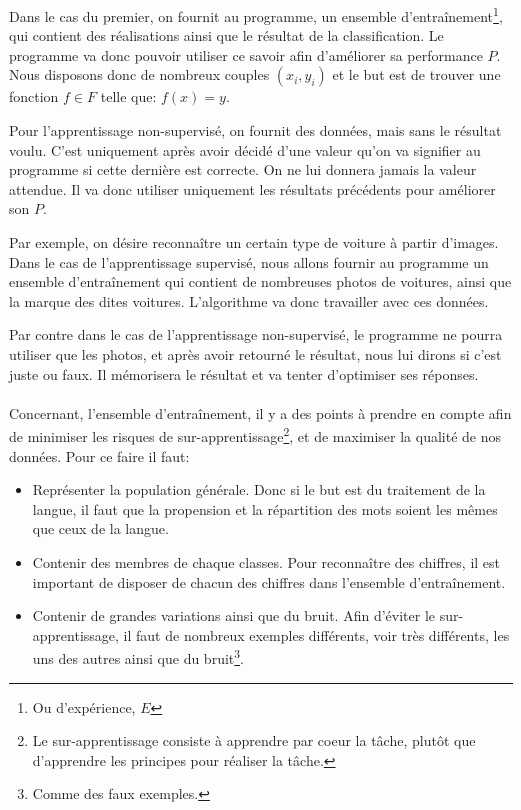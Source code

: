 \documentclass[a4paper, 11pt]{article}
\begin{document}
Dans le cas du premier, on fournit au programme, un ensemble d'entraînement\footnote{Ou d'expérience, $E$}, qui contient des réalisations ainsi que le résultat de la classification. Le programme va donc pouvoir utiliser ce savoir afin d'améliorer sa performance $P$.
Nous disposons donc de nombreux couples $(x_i, y_i)$ et le but est de trouver une fonction $f \in F$ telle que: $f(x) = y$.

Pour l'apprentissage non-supervisé, on fournit des données, mais sans le résultat voulu. C'est uniquement après avoir décidé d'une valeur qu'on va signifier au programme si cette dernière est correcte. On ne lui donnera jamais la valeur attendue. Il va donc utiliser uniquement les résultats précédents pour améliorer son $P$.

Par exemple, on désire reconnaître un certain type de voiture à partir d'images. Dans le cas de l'apprentissage supervisé, nous allons fournir au programme un ensemble d'entraînement qui contient de nombreuses photos de voitures, ainsi que la marque des dites voitures. L'algorithme va donc travailler avec ces données.

Par contre dans le cas de l'apprentissage non-supervisé, le programme ne pourra utiliser que les photos, et après avoir retourné le résultat, nous lui dirons si c'est juste ou faux. Il mémorisera le résultat et va tenter d'optimiser ses réponses.

\paragraph{}
Concernant, l'ensemble d'entraînement, il y a des points à prendre en compte afin de minimiser les risques de sur-apprentissage\footnote{Le sur-apprentissage consiste à apprendre par coeur la tâche, plutôt que d'apprendre les principes pour réaliser la tâche.}, et de maximiser la qualité de nos données.
Pour ce faire il faut:
\begin{itemize}
\item Représenter la population générale. Donc si le but est du traitement de la langue, il faut que la propension et la répartition des mots soient les mêmes que ceux de la langue.
\item Contenir des membres de chaque classes. Pour reconnaître des chiffres, il est important de disposer de chacun des chiffres dans l'ensemble d'entraînement.
\item Contenir de grandes variations ainsi que du bruit. Afin d'éviter le sur-apprentissage, il faut de nombreux exemples différents, voir très différents, les uns des autres ainsi que du bruit\footnote{Comme des faux exemples.}.
\end{itemize}
\end{document}
